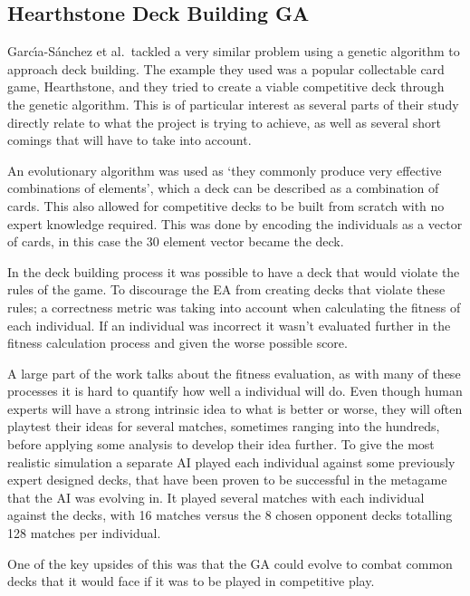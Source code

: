 \documentclass[a4paper]{article}
\begin{document}
\subsection{Hearthstone Deck Building GA}
\par
Garc{\'\i}a-S{\'a}nchez et al.\ tackled a very similar problem using a genetic algorithm to approach deck building\cite{hearthstoneAI}.
The example they used was a popular collectable card game, Hearthstone, and they tried to create a viable competitive deck through the genetic algorithm.
This is of particular interest as several parts of their study directly relate to what the project is trying to achieve, as well as several short comings that will have to take into account.
\par
An evolutionary algorithm was used as `they commonly produce very effective combinations of elements'\cite{hearthstoneAI}, which a deck can be described as a combination of cards.
This also allowed for competitive decks to be built from scratch with no expert knowledge required.
This was done by encoding the individuals as a vector of cards, in this case the 30 element vector became the deck.
\par
In the deck building process it was possible to have a deck that would violate the rules of the game.
To discourage the EA from creating decks that violate these rules; a correctness metric was taking into account when calculating the fitness of each individual.
If an individual was incorrect it wasn't evaluated further in the fitness calculation process and given the worse possible score\cite{hearthstoneAI}.
\\ \par
A large part of the work talks about the fitness evaluation, as with many of these processes it is hard to quantify how well a individual will do.
Even though human experts will have a strong intrinsic idea to what is better or worse, they will often playtest their ideas for several matches, sometimes ranging into the hundreds, before applying some analysis to develop their idea further.
To give the most realistic simulation a separate AI played each individual against some previously expert designed decks, that have been proven to be successful in the metagame that the AI was evolving in.
It played several matches with each individual against the decks, with 16 matches versus the 8 chosen opponent decks totalling 128 matches per individual\cite{hearthstoneAI}.
\par
One of the key upsides of this was that the GA could evolve to combat common decks that it would face if it was to be played in competitive play.
\end{document}
